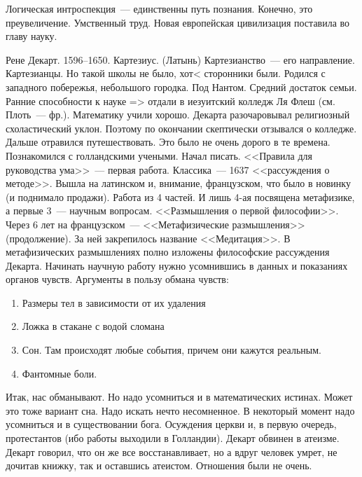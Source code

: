 Логическая интроспекция~--- единственны путь познания. Конечно, это преувеличение. Умственный труд. Новая европейская цивилизация поставила во главу науку.

Рене Декарт. 1596--1650.
Картезиус. (Латынь) 
Картезианство~--- его направление. Картезианцы. Но такой школы не было, хот< сторонники были.
Родился с западного побережья, небольшого городка. Под Нантом. Средний достаток семьи. Ранние способности к науке => отдали в иезуитский колледж Ля Флеш (см. Плоть~--- фр.). Математику учили хорошо. Декарта разочаровывал религиозный схоластический уклон. Поэтому по окончании скептически отзывался о колледже. Дальше отравился путешествовать. Это было не очень дорого в те времена. Познакомился с голландскими учеными. Начал писать. <<Правила для руководства ума>>~--- первая работа. Классика~--- 1637 <<рассуждения о методе>>. Вышла на латинском и, внимание, французском, что было в новинку (и поднимало продажи). Работа из 4 частей. И лишь 4-ая посвящена метафизике, а первые 3~--- научным вопросам. <<Размышления о первой философии>>. Через 6 лет на французском~--- <<Метафизические размышления>> (продолжение). За ней закрепилось название <<Медитация>>. В метафизических размышлениях полно изложены философские рассуждения Декарта. Начинать научную работу нужно усомнившись в данных и показаниях органов чувств. Аргументы в пользу обмана чувств:

\begin{enumerate}
	\item Размеры тел в зависимости от их удаления
	\item Ложка в стакане с водой сломана
	\item Сон. Там происходят любые события, причем они кажутся реальным.
	\item Фантомные боли.
\end{enumerate}

Итак, нас обманывают. Но надо усомниться и в математических истинах. Может это тоже вариант сна. Надо искать нечто несомненное. В некоторый момент надо усомниться и в существовании бога. Осуждения церкви и, в первую очередь, протестантов (ибо работы выходили в Голландии). Декарт обвинен в атеизме. Декарт говорил, что он же все восстанавливает, но а вдруг человек умрет, не дочитав книжку, так и оставшись атеистом. Отношения были не очень.

